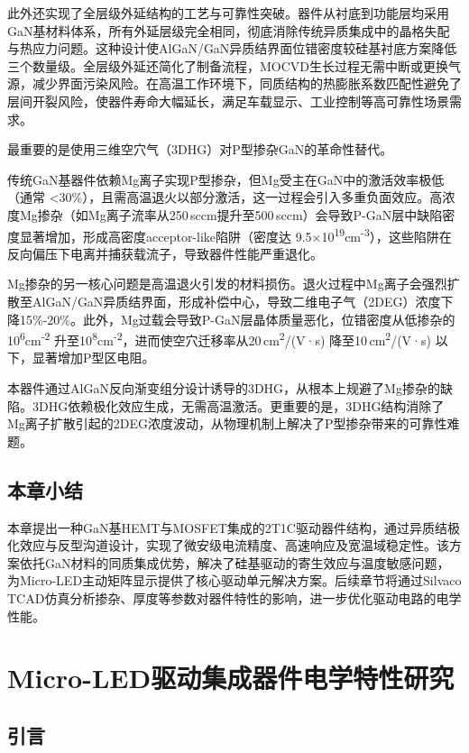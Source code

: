 \documentclass[
    oneside,                %
    fontset = win, %
  ]{njuthesis}
\begin{document}
此外还实现了全层级外延结构的工艺与可靠性突破。器件从衬底到功能层均采用GaN基材料体系，所有外延层级完全相同，彻底消除传统异质集成中的晶格失配与热应力问题。这种设计使AlGaN/GaN异质结界面位错密度较硅基衬底方案降低三个数量级。全层级外延还简化了制备流程，MOCVD生长过程无需中断或更换气源，减少界面污染风险。在高温工作环境下，同质结构的热膨胀系数匹配性避免了层间开裂风险，使器件寿命大幅延长，满足车载显示、工业控制等高可靠性场景需求。

最重要的是使用三维空穴气（3DHG）对P型掺杂GaN的革命性替代。

传统GaN基器件依赖Mg离子实现P型掺杂，但Mg受主在GaN中的激活效率极低（通常 <30\%），且需高温退火以部分激活，这一过程会引入多重负面效应。高浓度Mg掺杂（如Mg离子流率从250\,sccm提升至500\,sccm）会导致P-GaN层中缺陷密度显著增加，形成高密度acceptor-like陷阱（密度达 9.5×10\textsuperscript{19}cm\textsuperscript{-3}）\cite{guo2022influence}，这些陷阱在反向偏压下电离并捕获载流子，导致器件性能严重退化。

Mg掺杂的另一核心问题是高温退火引发的材料损伤。退火过程中Mg离子会强烈扩散至AlGaN/GaN异质结界面，形成补偿中心，导致二维电子气（2DEG）浓度下降15\%-20\%。此外，Mg过载会导致P-GaN层晶体质量恶化，位错密度从低掺杂的10\textsuperscript{6}cm\textsuperscript{-2} 升至10\textsuperscript{8}cm\textsuperscript{-2}，进而使空穴迁移率从20\,cm\textsuperscript{2}/(V·s) 降至10\,cm\textsuperscript{2}/(V·s) 以下，显著增加P型区电阻\cite{guo2022influence}。

本器件通过AlGaN反向渐变组分设计诱导的3DHG，从根本上规避了Mg掺杂的缺陷。3DHG依赖极化效应生成，无需高温激活。更重要的是，3DHG结构消除了Mg离子扩散引起的2DEG浓度波动，从物理机制上解决了P型掺杂带来的可靠性难题。

\section{本章小结}

本章提出一种GaN基HEMT与MOSFET集成的2T1C驱动器件结构，通过异质结极化效应与反型沟道设计，实现了微安级电流精度、高速响应及宽温域稳定性。该方案依托GaN材料的同质集成优势，解决了硅基驱动的寄生效应与温度敏感问题，为Micro-LED主动矩阵显示提供了核心驱动单元解决方案。后续章节将通过Silvaco TCAD仿真分析掺杂、厚度等参数对器件特性的影响，进一步优化驱动电路的电学性能。


\chapter{Micro-LED驱动集成器件电学特性研究}

\section{引言}
\end{document}
